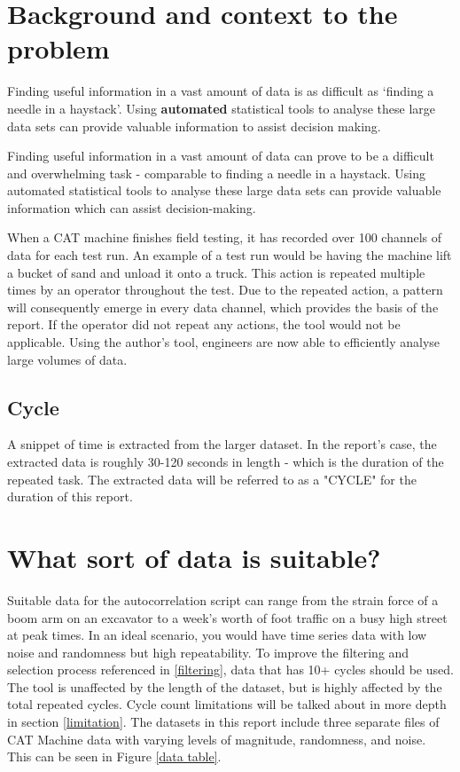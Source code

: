 \raggedright
\section{Background and context to the problem}
Finding useful information in a vast amount of data is as difficult as `finding a needle in a haystack'. Using \textbf{automated} statistical tools to analyse these large data sets can provide valuable information to assist decision making.

Finding useful information in a vast amount of data can prove to be a difficult and overwhelming task - comparable to finding a needle in a haystack. Using automated statistical tools to analyse these large data sets can provide valuable information which can assist decision-making. 

When a CAT machine finishes field testing, it has recorded over 100 channels of data for each test run. An example of a test run would be having the machine lift a bucket of sand and unload it onto a truck. This action is repeated multiple times by an operator throughout the test. Due to the repeated action, a pattern will consequently emerge in every data channel, which provides the basis of the report. If the operator did not repeat any actions, the tool would not be applicable. Using the author's tool, engineers are now able to efficiently analyse large volumes of data. 


\subsection{Cycle}
A snippet of time is extracted from the larger dataset. In the report's case, the extracted data is roughly 30-120 seconds in length - which is the duration of the repeated task. The extracted data will be referred to as a "CYCLE" for the duration of this report. 

\section{What sort of data is suitable?}
Suitable data for the autocorrelation script can range from the strain force of a boom arm on an excavator to a week's worth of foot traffic on a busy high street at peak times.  In an ideal scenario, you would have time series data with low noise and randomness but high repeatability. To improve the filtering and selection process referenced in \ref{filtering}, data that has 10+ cycles should be used. The tool is unaffected by the length of the dataset, but is highly affected by the total repeated cycles. Cycle count limitations will be talked about in more depth in section \ref{limitation}. The datasets in this report include three separate files of CAT Machine data with varying levels of magnitude, randomness, and noise. This can be seen in Figure \ref{data table}. 

